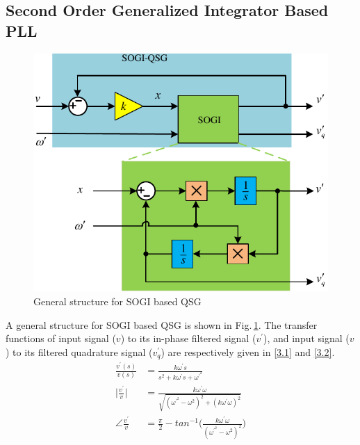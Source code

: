 \subsection{Second Order Generalized Integrator Based PLL}
\begin{figure}[]   
	\centering
	\includegraphics[scale=1]{figures/Chapter_3/Mine/SOGI-OSG.pdf}
	\caption{General structure for SOGI based QSG}
	\label{fig3.1}
\end{figure}
\vspace*{-0.8cm}
A general structure for SOGI based QSG is shown in Fig.\,\ref{fig3.1}. The transfer functions of input signal ($v$) to its in-phase filtered signal ($v^{\prime}$), and input signal ($v$) to its filtered quadrature signal ($v^{\prime}_{q}$) are respectively given in \eqref{3.1} and \eqref{3.2}.
\begin{equation} \label{3.1}
		\begin{aligned}
			\frac{v^{\prime}(s)}{v(s)} &= \frac{k\omega^{\prime} s}{s^{2} + k\omega^{\prime} s + \omega^{\prime^{2}}} \\
			\Big|\frac{v^{\prime}}{v}\Big| &= \frac{k\omega^{\prime}\omega}{\sqrt{(\omega^{\prime^{2}}-\omega^{2})^{2} + (k\omega^{\prime}\omega)^{2}}} \\
			\angle{\frac{v^{\prime}}{v}}  &= \frac{\pi}{2} - tan^{-1}\Big(\frac{k\omega^{\prime}\omega}{(\omega^{\prime^{2}}-\omega^{2})^{2}}\Big)
		\end{aligned}
\end{equation}
